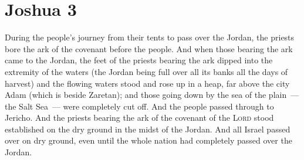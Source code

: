\section{Joshua 3}\label{Joshua 3}
\begin{enumerate}[align=center]
     During the people's journey from their tents to pass over the Jordan, the priests bore the ark of the covenant before the people.%
     And when those bearing the ark came to the Jordan, the feet of the priests bearing the ark dipped into the extremity of the waters (the Jordan being full over all its banks all the days of harvest)%
     and the flowing waters stood and rose up in a heap, far above the city Adam (which is beside Zaretan); and those going down by the sea of the plain~--- the Salt Sea~--- were completely cut off. And the people passed through to Jericho.%
     And the priests bearing the ark of the covenant of the \textsc{Lord} stood established on the dry ground in the midst of the Jordan. And all Israel passed over on dry ground, even until the whole nation had completely passed over the Jordan.%
\end{enumerate}

